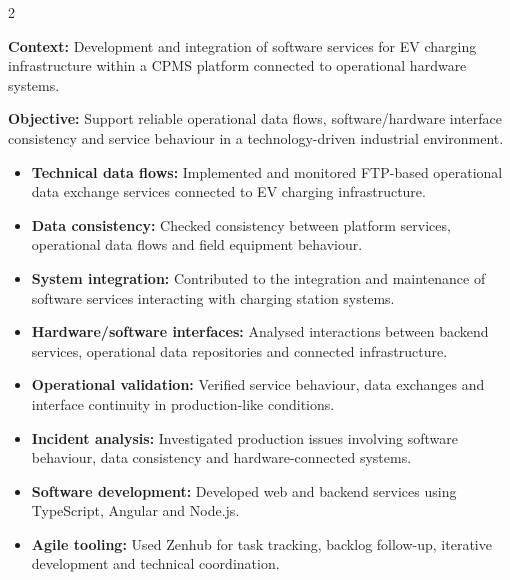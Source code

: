 \documentclass[8pt,a4paper,ragged2e,withhyper]{altacv}
\begin{document}



\makecvheader
\vspace{-0.3cm}


\begin{paracol}{2}



\textbf{Context:} Development and integration of software services for EV charging infrastructure within a CPMS platform connected to operational hardware systems.

\textbf{Objective:} Support reliable operational data flows, software/hardware interface consistency and service behaviour in a technology-driven industrial environment.

\begin{itemize}
  \item \textbf{Technical data flows:} Implemented and monitored FTP-based operational data exchange services connected to EV charging infrastructure.
  \item \textbf{Data consistency:} Checked consistency between platform services, operational data flows and field equipment behaviour.
  \item \textbf{System integration:} Contributed to the integration and maintenance of software services interacting with charging station systems.
  \item \textbf{Hardware/software interfaces:} Analysed interactions between backend services, operational data repositories and connected infrastructure.
  \item \textbf{Operational validation:} Verified service behaviour, data exchanges and interface continuity in production-like conditions.
  \item \textbf{Incident analysis:} Investigated production issues involving software behaviour, data consistency and hardware-connected systems.
  \item \textbf{Software development:} Developed web and backend services using TypeScript, Angular and Node.js.
  \item \textbf{Agile tooling:} Used Zenhub for task tracking, backlog follow-up, iterative development and technical coordination.
\end{itemize}


\end{paracol}
\end{document}
